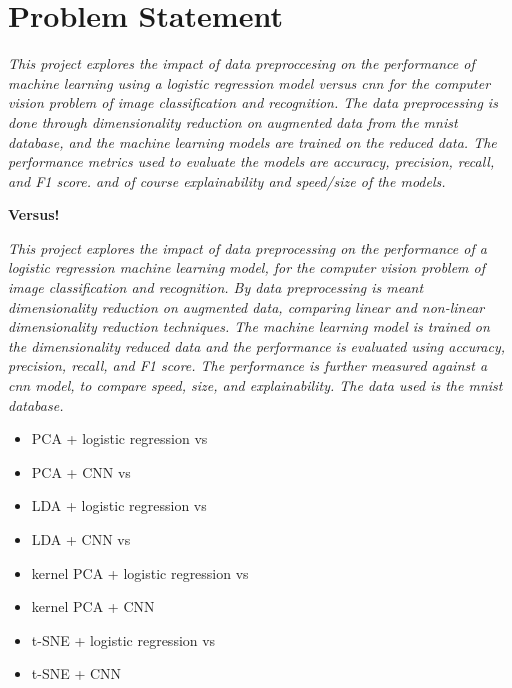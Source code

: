 \section{Problem Statement}\label{sec:problem-statement}


\emph{This project explores the impact of data preproccesing on the performance of machine learning using a logistic regression model versus \gls{cnn} for the computer vision problem of image classification and recognition. The data preprocessing is done through dimensionality reduction on augmented data from the \gls{mnist} database, and the machine learning models are trained on the reduced data. The performance metrics used to evaluate the models are accuracy, precision, recall, and F1 score. and of course explainability and speed/size of the models.}

\vspace{2mm}
\textbf{Versus!}
\vspace{2mm}

\noindent
\emph{This project explores the impact of data preprocessing on the performance of a logistic regression machine learning model, for the computer vision problem of image classification and recognition. By data preprocessing is meant dimensionality reduction on augmented data, comparing linear and non-linear dimensionality reduction techniques. The machine learning model is trained on the dimensionality reduced data and the performance is evaluated using accuracy, precision, recall, and F1 score. The performance is further measured against a \gls{cnn} model, to compare speed, size, and explainability. The data used is the \gls{mnist} database.}


\begin{itemize}
    \setlength\itemsep{0em}
    \item PCA + logistic regression vs
    \item PCA + CNN vs
    \item LDA + logistic regression vs
    \item LDA + CNN vs
    \item kernel PCA + logistic regression vs
    \item kernel PCA + CNN
    \item t-SNE + logistic regression vs
    \item t-SNE + CNN
\end{itemize}




